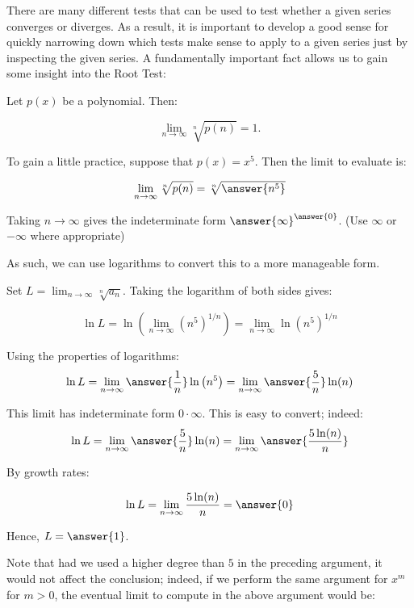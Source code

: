 \documentclass{ximera}
\author{Jim Talamo}
\begin{document}
\begin{exercise}
There are many different tests that can be used to test whether a given series converges or diverges.  As a result, it is important to develop a good sense for quickly narrowing down which tests make sense to apply to a given series just by inspecting the given series.  A fundamentally important fact allows us to gain some insight into the Root Test:

\begin{fact}
Let $p(x)$ be a polynomial.  Then:

\[
\lim_{n \to \infty} \sqrt[n]{p(n)} = 1.
\]
\end{fact}

\begin{exercise}
To gain a little practice, suppose that $p(x) = x^5$.  Then the limit to evaluate is:

\[
\lim_{n \to \infty}\sqrt[n]{p(n)} = \sqrt[n]{\answer{n^5}}
\]

Taking $n \to \infty$ gives the indeterminate form $\answer{\infty}^{\answer{0}}$. 
(Use $\infty$ or $-\infty$ where appropriate)

As such, we can use logarithms to convert this to a more manageable form.

Set $L = \lim_{n \to \infty} \sqrt[n]{a_n}$.  Taking the logarithm of both sides gives:

\[
\ln L = \ln  \left( \lim_{n \to \infty} \left(n^5\right)^{1/n} \right) = \lim_{n \to \infty} \ln \left(n^5\right)^{1/n} 
\]

Using the properties of logarithms:
\[
\ln L = \lim_{n \to \infty} \answer{\frac{1}{n}} \ln \left(n^5\right) = \lim_{n \to \infty} \answer{\frac{5}{n}} \ln(n)
\]

This limit has indeterminate form $0 \cdot \infty$. This is easy to convert; indeed:
\[
\ln L = \lim_{n \to \infty} \answer{\frac{5}{n}} \ln(n) = \lim_{n \to \infty} \answer{\frac{5\ln(n)}{n}}
\]

\begin{exercise}
By growth rates: 

\[
\ln L  = \lim_{n \to \infty} \frac{5\ln(n)}{n} = \answer{0}
\]

Hence, $L = \answer{1}$.
\end{exercise}

Note that had we used a higher degree than $5$ in the preceding argument, it would not affect the conclusion; indeed, if we perform the same argument for $x^m$ for $m>0$, the eventual limit to compute in the above argument would be:


\end{exercise}
\end{exercise}
\end{document}
